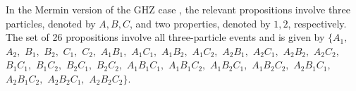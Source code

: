 

In the Mermin version \cite{mermin,mermin-93} of the GHZ case \cite{ghz,ghsz},
the relevant propositions involve three particles,
denoted by $A,B,C$,
and two properties, denoted by $1,2$, respectively.
The set of 26 propositions involve all three-particle events and is given by
$\{
 A_1        ,$ $
 A_2        ,$ $
 B_1        ,$ $
 B_2        ,$ $
 C_1        ,$ $
 C_2        ,$ $
 A_1B_1     ,$ $
 A_1C_1     ,$ $
 A_1B_2     ,$ $
 A_1C_2     ,$ $
 A_2B_1     ,$ $
 A_2C_1     ,$ $
 A_2B_2     ,$ $
 A_2C_2     ,$ $
 B_1C_1     ,$ $
 B_1C_2     ,$ $
 B_2C_1     ,$ $
 B_2C_2     ,$ $
 A_1B_1C_1  ,$ $
 A_1B_1C_2  ,$ $
 A_1B_2C_1  ,$ $
 A_1B_2C_2  ,$ $
 A_2B_1C_1  ,$ $
 A_2B_1C_2  ,$ $
 A_2B_2C_1  ,$ $
 A_2B_2C_2
\}$.


